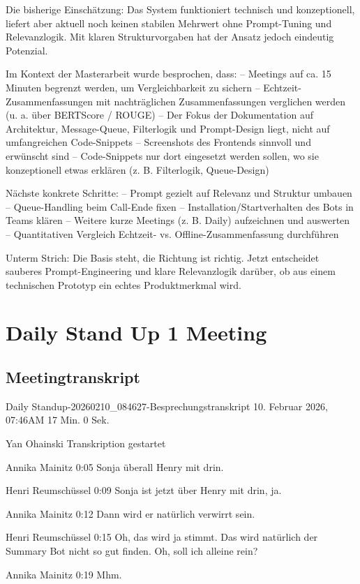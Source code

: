 Die bisherige Einschätzung: Das System funktioniert technisch und konzeptionell, liefert aber aktuell noch keinen stabilen Mehrwert ohne Prompt-Tuning und Relevanzlogik. Mit klaren Strukturvorgaben hat der Ansatz jedoch eindeutig Potenzial.

Im Kontext der Masterarbeit wurde besprochen, dass:
– Meetings auf ca. 15 Minuten begrenzt werden, um Vergleichbarkeit zu sichern
– Echtzeit-Zusammenfassungen mit nachträglichen Zusammenfassungen verglichen werden (u. a. über BERTScore / ROUGE)
– Der Fokus der Dokumentation auf Architektur, Message-Queue, Filterlogik und Prompt-Design liegt, nicht auf umfangreichen Code-Snippets
– Screenshots des Frontends sinnvoll und erwünscht sind
– Code-Snippets nur dort eingesetzt werden sollen, wo sie konzeptionell etwas erklären (z. B. Filterlogik, Queue-Design)

Nächste konkrete Schritte:
– Prompt gezielt auf Relevanz und Struktur umbauen
– Queue-Handling beim Call-Ende fixen
– Installation/Startverhalten des Bots in Teams klären
– Weitere kurze Meetings (z. B. Daily) aufzeichnen und auswerten
– Quantitativen Vergleich Echtzeit- vs. Offline-Zusammenfassung durchführen

Unterm Strich: Die Basis steht, die Richtung ist richtig. Jetzt entscheidet sauberes Prompt-Engineering und klare Relevanzlogik darüber, ob aus einem technischen Prototyp ein echtes Produktmerkmal wird.

\section{Daily Stand Up 1 Meeting}
\subsection{Meetingtranskript}
\label{app:Daily1_transkript}
Daily Standup-20260210\_084627-Besprechungstranskript
10. Februar 2026, 07:46AM
17 Min. 0 Sek.

Yan Ohainski Transkription gestartet

Annika Mainitz   0:05
Sonja überall Henry mit drin.

Henri Reumschüssel   0:09
Sonja ist jetzt über Henry mit drin, ja.

Annika Mainitz   0:12
Dann wird er natürlich verwirrt sein.

Henri Reumschüssel   0:15
Oh, das wird ja stimmt. Das wird natürlich der Summary Bot nicht so gut finden. Oh, soll ich alleine rein?

Annika Mainitz   0:19
Mhm.

